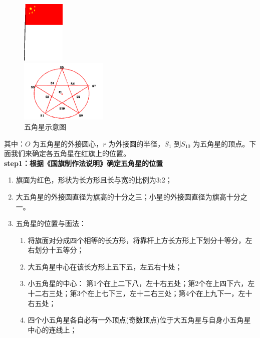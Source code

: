             \begin{figure}[H]
              \centering
              \begin{varwidth}[t]{\textwidth}
                \vspace{0pt}
                \includegraphics[height=3cm]{images/10.jpg}
              \end{varwidth}
              \qquad \qquad
              \begin{varwidth}[t]{\textwidth}
                \vspace{0pt}
                \includegraphics[height=3cm]{images/11.jpg}
              \end{varwidth}
              \caption{五角星示意图}
              \label{五角星示意图}
            \end{figure}
            \noindent 其中：$O$ 为五角星的外接圆心，$r$ 为外接圆的半径，$S_{1}$ 到$S_{10}$ 为五角星的顶点。下面我们来确定各五角星在红旗上的位置。\\
            \textbf{step1：根据《国旗制作法说明》确定五角星的位置}
            \begin{enumerate}
              \item 旗面为红色，形状为长方形且长与宽的比例为3:2；
              \item 大五角星的外接圆直径为旗高的十分之三；小星的外接圆直径为旗高十分之一。
              \item 五角星的位置与画法：
                \begin{enumerate}
                   \item 将旗面对分成四个相等的长方形，将靠杆上方长方形上下划分十等分，左右划分十五等分；
                    \item 大五角星中心在该长方形上五下五，左五右十处；
                    \item 小五角星的中心： 第1个在上二下八，左十右五处；第2个在上四下六，左十二右三处；第3个在上七下三，左十二右三处；第4个在上九下一，左十右五处；
                    \item 四个小五角星各自必有一外顶点(奇数顶点)位于大五角星与自身小五角星中心的连线上；
                \end{enumerate}
            \end{enumerate}
